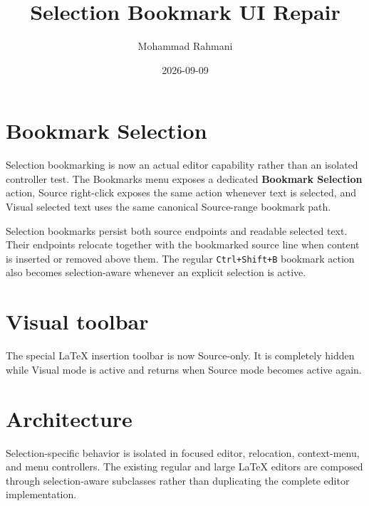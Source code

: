 \documentclass[a4paper]{article}
\title{Selection Bookmark UI Repair}
\date{2026-09-09}
\author{Mohammad Rahmani}
\begin{document}
   \maketitle

   \section{Bookmark Selection}

   Selection bookmarking is now an actual editor capability rather than an
   isolated controller test.  The Bookmarks menu exposes a dedicated
   \textbf{Bookmark Selection} action, Source right-click exposes the same
   action whenever text is selected, and Visual selected text uses the same
   canonical Source-range bookmark path.

   Selection bookmarks persist both source endpoints and readable selected
   text.  Their endpoints relocate together with the bookmarked source line
   when content is inserted or removed above them.  The regular
   \verb|Ctrl+Shift+B| bookmark action also becomes selection-aware whenever an
   explicit selection is active.

   \section{Visual toolbar}

   The special LaTeX insertion toolbar is now Source-only.  It is completely
   hidden while Visual mode is active and returns when Source mode becomes
   active again.

   \section{Architecture}

   Selection-specific behavior is isolated in focused editor, relocation,
   context-menu, and menu controllers.  The existing regular and large LaTeX
   editors are composed through selection-aware subclasses rather than
   duplicating the complete editor implementation.

   
   
\end{document}
